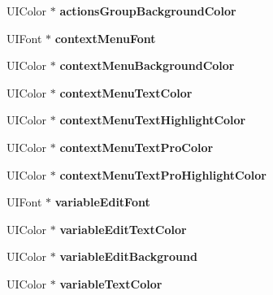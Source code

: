\begin{DoxyCompactItemize}
\mbox{\label{interface_l_u_theme_a96487757903c239b11daf8e1a4946302}} 
U\+I\+Color $\ast$ {\bfseries actions\+Group\+Background\+Color}
\item 
\mbox{\label{interface_l_u_theme_a686e594cd2b7713deebc65a540bc3921}} 
U\+I\+Font $\ast$ {\bfseries context\+Menu\+Font}
\item 
\mbox{\label{interface_l_u_theme_ae4f84d7f2dbb3735238a7b348f6f992e}} 
U\+I\+Color $\ast$ {\bfseries context\+Menu\+Background\+Color}
\item 
\mbox{\label{interface_l_u_theme_a7b862a239a0e682b5f57d147ac3c98ce}} 
U\+I\+Color $\ast$ {\bfseries context\+Menu\+Text\+Color}
\item 
\mbox{\label{interface_l_u_theme_a47631495e1e0721fb3a7facaf45be34c}} 
U\+I\+Color $\ast$ {\bfseries context\+Menu\+Text\+Highlight\+Color}
\item 
\mbox{\label{interface_l_u_theme_a4e7580d28fef4b7593a5ff881f2fc821}} 
U\+I\+Color $\ast$ {\bfseries context\+Menu\+Text\+Pro\+Color}
\item 
\mbox{\label{interface_l_u_theme_ab468ea824724c84af19e582371f293b9}} 
U\+I\+Color $\ast$ {\bfseries context\+Menu\+Text\+Pro\+Highlight\+Color}
\item 
\mbox{\label{interface_l_u_theme_aaaad14939571be3d1acb375982de239b}} 
U\+I\+Font $\ast$ {\bfseries variable\+Edit\+Font}
\item 
\mbox{\label{interface_l_u_theme_a2c5c9715f90789a52941ad4086b89320}} 
U\+I\+Color $\ast$ {\bfseries variable\+Edit\+Text\+Color}
\item 
\mbox{\label{interface_l_u_theme_a16202436d6715dfce9930a44c88c748a}} 
U\+I\+Color $\ast$ {\bfseries variable\+Edit\+Background}
\item 
\mbox{\label{interface_l_u_theme_a7e7ce08c3e519869a1392fd4ff81dd30}} 
U\+I\+Color $\ast$ {\bfseries variable\+Text\+Color}

\end{DoxyCompactItemize}
